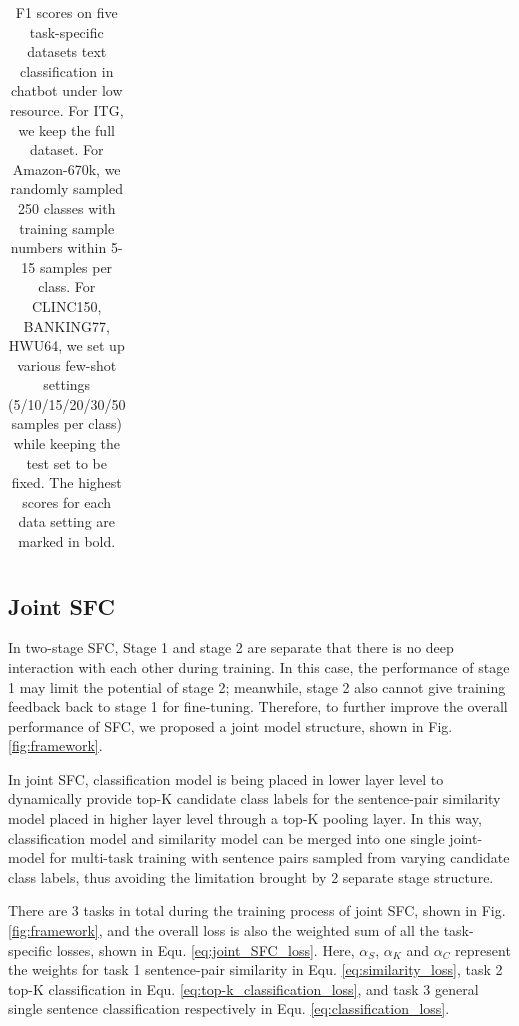 \documentclass[letterpaper]{article} %
\providecommand{\tabularnewline}{\\}
\begin{document}
\begin{table}
\begin{centering}
{\begin{tabular}{|c|cccccc|cccccc|cccccc|c|c|}
          & & & & & & & & & & & & & & & & & & & &\tabularnewline
          \hline
        \end{tabular}
      }
      \par
    \end{centering}
    \caption{
      F1 scores  on  five  task-specific  datasets text classification in chatbot
      under low resource. For ITG, we keep the full dataset. For Amazon-670k, we
      randomly  sampled  250  classes  with  training sample numbers within 5-15
      samples  per  class.  For  CLINC150,  BANKING77,  HWU64, we set up various
      few-shot  settings  (5/10/15/20/30/50 samples per class) while keeping the
      test  set to be fixed. The highest scores for each data setting are marked
      in bold.
    }
    \label{tbe:table2}
  \end{table}



  \subsection{Joint SFC}
  In  two-stage  SFC,  Stage  1  and  stage 2 are separate that there is no deep
  interaction  with each other during training. In this case, the performance of
  stage  1  may  limit  the potential of stage 2; meanwhile, stage 2 also cannot
  give  training feedback back to stage 1 for fine-tuning. Therefore, to further
  improve  the  overall performance of SFC, we proposed a joint model structure,
  shown in Fig. \ref{fig:framework}.

  In  joint  SFC,  classification  model is being placed in lower layer level to
  dynamically  provide  top-K  candidate  class  labels  for  the  sentence-pair
  similarity  model  placed in higher layer level through a top-K pooling layer.
  In  this way, classification model and similarity model can be merged into one
  single  joint-model  for  multi-task training with sentence pairs sampled from
  varying  candidate  class  labels,  thus  avoiding the limitation brought by 2
  separate stage structure.

  There  are 3 tasks in total during the training process of joint SFC, shown in
  Fig. \ref{fig:framework}, and the overall loss is also the weighted sum of all
  the   task-specific  losses,  shown  in  Equ.  \ref{eq:joint_SFC_loss}.  Here,
  $\alpha_S$,  $\alpha_K$  and  $\alpha_C$  represent  the  weights  for  task 1
  sentence-pair  similarity  in  Equ.  \ref{eq:similarity_loss},  task  2  top-K
  classification  in Equ. \ref{eq:top-k_classification_loss}, and task 3 general
  single       sentence       classification      respectively      in      Equ.
  \ref{eq:classification_loss}.
\end{document}
